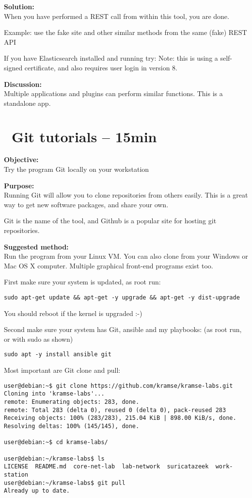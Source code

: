 \documentclass[a4paper,11pt,notitlepage]{report}
\begin{document}
{\bf Solution:}\\
When you have performed a REST call from within this tool, you are done.

Example: use the fake site  and other similar methods from the same (fake) REST API

If you have Elasticsearch installed and running try: 
Note: this is using a self-signed certificate, and also requires user login in version 8.

{\bf Discussion:}\\
Multiple applications and plugins can perform similar functions. This is a standalone app.


\chapter{\faExclamationTriangle\ Git tutorials -- 15min}
\label{ex:git-tutorial}



{\bf Objective:}\\
Try the program Git locally on your workstation

{\bf Purpose:}\\
Running Git will allow you to clone repositories from others easily. This is a great way to get new software packages, and share your own.

Git is the name of the tool, and Github is a popular site for hosting git repositories.

{\bf Suggested method:}\\
Run the program from your Linux VM. You can also clone from your Windows or Mac OS X computer. Multiple graphical front-end programs exist too.

First make sure your system is updated, as root run:

\begin{verbatim}
sudo apt-get update && apt-get -y upgrade && apt-get -y dist-upgrade
\end{verbatim}
You should reboot if the kernel is upgraded :-)

Second make sure your system has Git, ansible and my playbooks: (as root run, or with sudo as shown)
\begin{verbatim}
sudo apt -y install ansible git
\end{verbatim}

Most important are Git clone and pull:
\begin{verbatim}
user@debian:~$ git clone https://github.com/kramse/kramse-labs.git
Cloning into 'kramse-labs'...
remote: Enumerating objects: 283, done.
remote: Total 283 (delta 0), reused 0 (delta 0), pack-reused 283
Receiving objects: 100% (283/283), 215.04 KiB | 898.00 KiB/s, done.
Resolving deltas: 100% (145/145), done.

user@debian:~$ cd kramse-labs/

user@debian:~/kramse-labs$ ls
LICENSE  README.md  core-net-lab  lab-network  suricatazeek  work-station
user@debian:~/kramse-labs$ git pull
Already up to date.
\end{verbatim}
\end{document}
